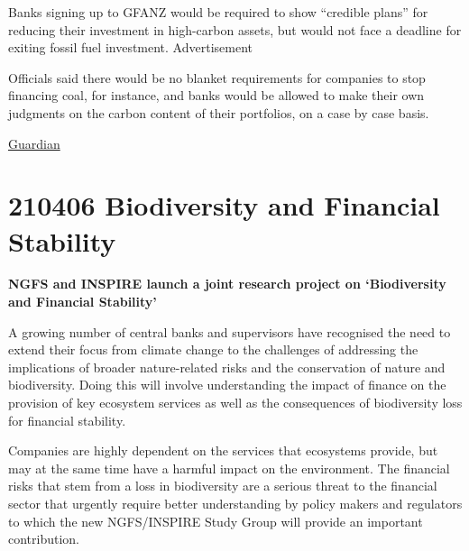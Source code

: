 \documentclass[
]{book}
\begin{document}
Banks signing up to GFANZ would be required to show ``credible plans'' for reducing their investment in high-carbon assets, but would not face a deadline for exiting fossil fuel investment.
Advertisement

Officials said there would be no blanket requirements for companies to stop financing coal, for instance, and banks would be allowed to make their own judgments on the carbon content of their portfolios, on a case by case basis.

\href{https://www.theguardian.com/business/2021/apr/21/leading-finance-firms-sign-up-to-mark-carney-forum-on-low-carbon-investment}{Guardian}

\hypertarget{biodiversity-and-financial-stability}{%
\section{210406 Biodiversity and Financial Stability}\label{biodiversity-and-financial-stability}}

\textbf{NGFS and INSPIRE launch a joint research project on `Biodiversity and Financial Stability'}

A growing number of central banks and supervisors have recognised the need to extend their focus from climate change to the challenges of addressing the implications of broader nature-related risks and the conservation of nature and biodiversity. Doing this will involve understanding the impact of finance on the provision of key ecosystem services as well as the consequences of biodiversity loss for financial stability.

Companies are highly dependent on the services that ecosystems provide, but may at the same time have a harmful impact on the environment. The financial risks that stem from a loss in biodiversity are a serious threat to the financial sector that urgently require better understanding by policy makers and regulators to which the new NGFS/INSPIRE Study Group will provide an important contribution.

  
\end{document}
